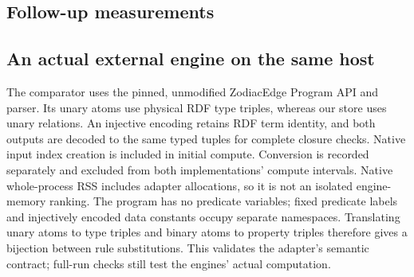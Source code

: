 \subsection{Follow-up measurements}





\subsection{An actual external engine on the same host}
The comparator uses the pinned, unmodified ZodiacEdge Program API and parser.
Its unary atoms use physical RDF type triples, whereas our store uses unary
relations. An injective encoding retains RDF term identity, and both outputs
are decoded to the same typed tuples for complete closure checks. Native input
index creation is included in initial compute. Conversion is recorded separately
and excluded from both implementations' compute intervals. Native whole-process
RSS includes adapter allocations, so it is not an isolated engine-memory ranking.
The program has no predicate variables; fixed predicate labels and injectively
encoded data constants occupy separate namespaces. Translating unary atoms to
type triples and binary atoms to property triples therefore gives a bijection
between rule substitutions. This validates the adapter's semantic contract;
full-run checks still test the engines' actual computation.

